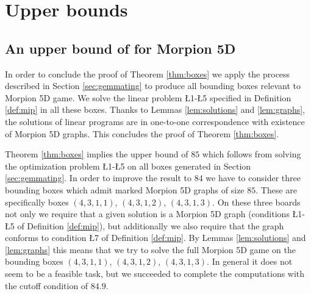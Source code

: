 
\section{Upper bounds}
\label{sec:upper}

  
\subsection{An upper bound of \therecord for Morpion 5D}
\label{subsec:84}

In order to conclude the proof of Theorem \ref{thm:boxes} we apply the process described in Section \ref{sec:gemmating} to produce all bounding boxes relevant 
to Morpion 5D game. We solve the linear problem \L{1}-\L{5} specified in Definition \ref{def:mip} in all these boxes. Thanks to 
Lemmas \ref{lem:solutions} and \ref{lem:graphs}, the solutions of linear programs are in one-to-one correspondence with existence of
Morpion 5D graphs. This concludes the proof of Theorem \ref{thm:boxes}.


Theorem \ref{thm:boxes} implies the upper bound of $85$ which follows from solving the optimization
problem \L{1}-\L{5} on all boxes generated in Section \ref{sec:gemmating}. 
In order to improve the result to $84$ we have to consider three bounding boxes which admit marked Morpion 5D graphs of size $85$. These
are specifically boxes $(4,3,1,1)$, $(4,3,1,2)$, $(4,3,1,3)$.
On these three boards %
not only we require that a given solution is a 
Morpion 5D graph (conditions \L{1}-\L{5} of Definition \ref{def:mip}), but additionally we also require that the graph conforms to condition \L{7} of Definition \ref{def:mip}. 
By Lemmas \ref{lem:solutions} and \ref{lem:graphs} this means that we try to solve the full Morpion 5D game on the bounding boxes  $(4,3,1,1)$, $(4,3,1,2)$, $(4,3,1,3)$.
In general it does not seem to be a feasible task, but we succeeded to complete the computations with the cutoff condition of $84.9$.

